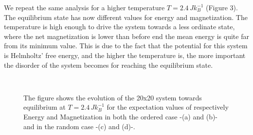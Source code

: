 \documentclass[%
 reprint,
 amsmath,amssymb,
 aps,
]{revtex4-1}
\theoremstyle{plain}
\theoremstyle{definition}
\theoremstyle{plain}
\begin{document}
We repeat the same analysis for a higher temperature $T=2.4\,Jk_B^{-1}$ (Figure 3). The equilibrium state has now different values for energy and magnetization. The temperature is high enough to drive the system towards a less ordinate state, where the net magnetization is lower than before end the mean energy is quite far from its minimum value. This is due to the fact that the potential for this system is Helmholtz' free energy, and the higher the temperature is, the more important the disorder of the system becomes for reaching the equilibrium state.

\begin{figure}[ht]
	\label{20T2}
	\\
	\caption{The figure shows the evolution of the 20x20 system towards equilibrium at $T=2.4\,Jk_B^{-1}$ for the expectation values of respectively Energy and Magnetization in both the ordered case -(a) and (b)- and in the random case -(c) and (d)-.}
\end{figure} 
\end{document}
